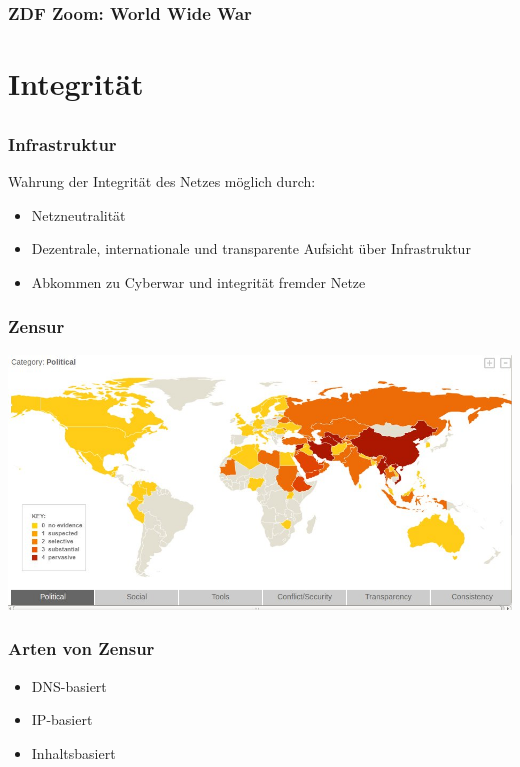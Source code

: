 \documentclass[12pt]{beamer}
\begin{document}
\begin{frame}
    \frametitle{ZDF Zoom: World Wide War}
\end{frame}

\section{Integrität}
\subsection{}

\begin{frame}
    \frametitle{Infrastruktur}
    Wahrung der Integrität des Netzes möglich durch:
    \begin{itemize}
      \item<1-> Netzneutralität
      \item<2-> Dezentrale, internationale und transparente Aufsicht über Infrastruktur
      \item<3-> Abkommen zu Cyberwar und integrität fremder Netze
    \end{itemize}
\end{frame}

\begin{frame}
    \frametitle{Zensur}
    \includegraphics[height=0.7\textheight]{img/zensur-guardian.jpg}
\end{frame}

\begin{frame}
    \frametitle{Arten von Zensur}
    \begin{itemize}
      \item<1-> DNS-basiert
      \item<2-> IP-basiert
      \item<3-> Inhaltsbasiert
    \end{itemize}
\end{frame}
\end{document}
